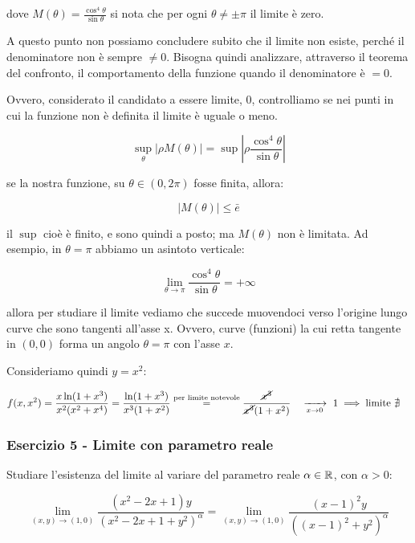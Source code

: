 dove \(M(\theta) = \frac{\cos^{4}\theta }{\sin\theta }\) si nota che per ogni \(\theta \neq \pm \pi \) il limite è zero.

A questo punto non possiamo concludere subito che il limite non esiste, perché il denominatore non è sempre \(\ne 0\). Bisogna quindi analizzare, attraverso il teorema del confronto, il comportamento della funzione quando il denominatore è \(= 0\).

Ovvero, considerato il candidato a essere limite, 0, controlliamo se nei punti in cui la funzione non è definita il limite è uguale o meno.

\[
    \underset{\theta}{\sup} \bigl|\rho M(\theta)\bigr| = \sup\left|\rho \frac{\cos^{4}\theta }{\sin\theta }\right|
\]

se la nostra funzione, su \(\theta \in (0,2\pi)\) fosse finita, allora:

\[
    |M(\theta) | \le \bar{e}
\]

il \(\sup \) cioè è finito, e sono quindi a posto; ma \(M(\theta) \) non è limitata. Ad esempio, in \(\theta= \pi \) abbiamo un asintoto verticale:

\[
    \lim_{ \theta \to \pi } \frac{\cos^{4}\theta }{\sin\theta }= +\infty
\]

allora per studiare il limite vediamo che succede muovendoci verso l'origine lungo curve che sono tangenti all'asse x. Ovvero, curve (funzioni) la cui retta tangente in \((0,0)\) forma un angolo \(\theta = \pi \) con l'asse \(x\).

Consideriamo quindi \(y=x^{2}\):

\begin{align*}
    f(x,x^{2}) & = \frac{x\ln(1+x^{3})}{x^{2}(x^{2}+x^{4})} = \frac{\ln(1+x^{3})}{x^{3}(1+x^{2})} \overset{\text{per limite notevole}}{=} \frac{\cancel{x^3}}{\cancel{x^{3}}(1+x^{2})} \quad \xrightarrow[x \to 0]{}\  1 \implies \text{limite } \nexists
\end{align*}

\filbreak{}
\subsubsection*{Esercizio 5 {-} Limite con parametro reale}

Studiare l'esistenza del limite al variare del parametro reale \(\alpha \in \mathbb{R} \), con \(\alpha >0\):

\[
    \lim_{ (x,y) \to (1,0) } \frac{(x^2-2x+1)y}{{(x^2-2x+1+y^2)}^{\alpha}} =
    \lim_{ (x,y) \to (1,0) } \frac{{(x-1)}^2 y}{{\left({(x-1)}^2 + y^2\right)}^{\alpha}}
\]

